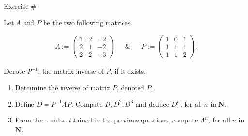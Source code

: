 Exercise \#

Let \(A\) and \(P\) be the two following matrices.

\[\begin{aligned}
&A:=  \begin{pmatrix}1 & 2 & -2\\2 & 1 & -2\\2 & 2 & -3\end{pmatrix}&
& \& & 
&P:=  \begin{pmatrix}1 & 0 & 1\\1 & 1 & 1\\1 & 1 & 2\end{pmatrix}.&
\end{aligned}\]

Denote \(P^{-1}\), the matrix inverse of \(P\), if it exists.

\begin{enumerate}
\def\labelenumi{\arabic{enumi}.}
\item
  Determine the inverse of matrix \(P\), denoted \(P\).
\item
  Define \(D=P^{-1}AP\). Compute \(D, D^{2}, D^{3}\) and deduce
  \(D^{n}\), for all \(n\) in \({\mathbf{N}}\).
\item
  From the results obtained in the previous questions, compute
  \(A^{n}\), for all \(n\) in \({\mathbf{N}}\).
\end{enumerate}
